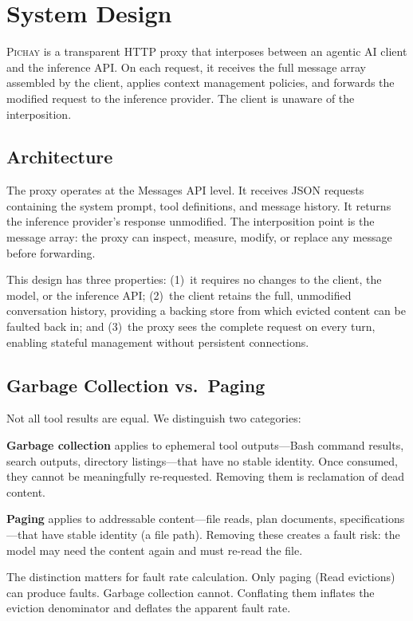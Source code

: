 \section{System Design}
\label{sec:system}

\textsc{Pichay} is a transparent HTTP proxy that interposes between
an agentic AI client and the inference API. On each request, it
receives the full message array assembled by the client, applies
context management policies, and forwards the modified request to
the inference provider. The client is unaware of the interposition.

\subsection{Architecture}

The proxy operates at the Messages API level. It receives JSON
requests containing the system prompt, tool definitions, and message
history. It returns the inference provider's response unmodified.
The interposition point is the message array: the proxy can inspect,
measure, modify, or replace any message before forwarding.

This design has three properties: (1)~it requires no changes to the
client, the model, or the inference API; (2)~the client retains the
full, unmodified conversation history, providing a backing store
from which evicted content can be faulted back in; and (3)~the proxy
sees the complete request on every turn, enabling stateful
management without persistent connections.

\subsection{Garbage Collection vs.\ Paging}

Not all tool results are equal. We distinguish two categories:

\textbf{Garbage collection} applies to ephemeral tool outputs---Bash
command results, search outputs, directory listings---that have no
stable identity. Once consumed, they cannot be meaningfully
re-requested. Removing them is reclamation of dead content.

\textbf{Paging} applies to addressable content---file reads, plan
documents, specifications---that have stable identity (a file path).
Removing these creates a fault risk: the model may need the content
again and must re-read the file.

The distinction matters for fault rate calculation. Only paging
(Read evictions) can produce faults. Garbage collection cannot.
Conflating them inflates the eviction denominator and deflates the
apparent fault rate.

